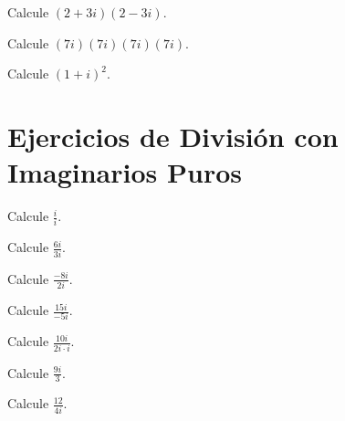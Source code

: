 \begin{ejercicio}
Calcule $\displaystyle (2+3i)(2-3i)$.
\end{ejercicio}

\begin{ejercicio}
Calcule $\displaystyle (7i)(7i)(7i)(7i)$.
\end{ejercicio}

\begin{ejercicio}
Calcule $\displaystyle (1+i)^2$.
\end{ejercicio}




\section*{Ejercicios de División con Imaginarios Puros}

\begin{ejercicio}
Calcule $\displaystyle \frac{i}{i}$.
\end{ejercicio}

\begin{ejercicio}
Calcule $\displaystyle \frac{6i}{3i}$.
\end{ejercicio}

\begin{ejercicio}
Calcule $\displaystyle \frac{-8i}{2i}$.
\end{ejercicio}

\begin{ejercicio}
Calcule $\displaystyle \frac{15i}{-5i}$.
\end{ejercicio}

\begin{ejercicio}
Calcule $\displaystyle \frac{10i}{2i\cdot i}$.
\end{ejercicio}

\begin{ejercicio}
Calcule $\displaystyle \frac{9i}{3}$.
\end{ejercicio}

\begin{ejercicio}
Calcule $\displaystyle \frac{12}{4i}$.
\end{ejercicio}

